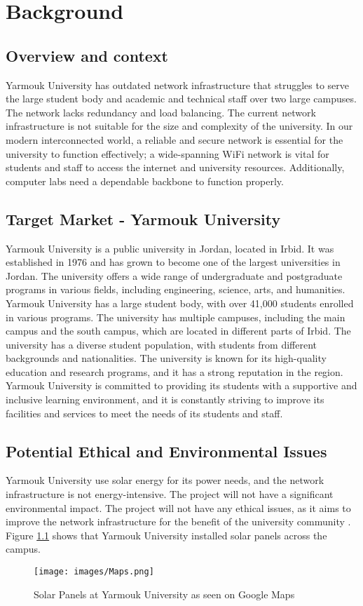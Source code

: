 \documentclass[12pt]{report}
\begin{document}

\chapter{Background}
\section{Overview and context}

Yarmouk University has outdated network infrastructure that struggles to serve the large student body and academic and technical staff over two large campuses. The network lacks redundancy and load balancing. The current network infrastructure is not suitable for the size and complexity of the university. In our modern interconnected world, a reliable and secure network is essential for the university to function effectively; a wide-spanning WiFi network is vital for students and staff to access the internet and university resources. Additionally, computer labs need a dependable backbone to function properly.
\section{Target Market - Yarmouk University}
Yarmouk University is a public university in Jordan, located in Irbid. It was established in 1976 and has grown to become one of the largest universities in Jordan. The university offers a wide range of undergraduate and postgraduate programs in various fields, including engineering, science, arts, and humanities. Yarmouk University has a large student body, with over 41,000 students enrolled in various programs. The university has multiple campuses, including the main campus and the south campus, which are located in different parts of Irbid. The university has a diverse student population, with students from different backgrounds and nationalities. The university is known for its high-quality education and research programs, and it has a strong reputation in the region. Yarmouk University is committed to providing its students with a supportive and inclusive learning environment, and it is constantly striving to improve its facilities and services to meet the needs of its students and staff. \cite{YU}

\section{Potential Ethical and Environmental Issues}
Yarmouk University use solar energy for its power needs, and the network infrastructure is not energy-intensive. The project will not have a significant environmental impact. The project will not have any ethical issues, as it aims to improve the network infrastructure for the benefit of the university community \cite{Solar}. Figure \ref{fig:YUMap} shows that Yarmouk University installed solar panels across the campus. 
\begin{figure}[h]
    \centering
    \texttt{[image: images/Maps.png]}
    \caption{Solar Panels at Yarmouk University as seen on Google Maps}
    \label{fig:YUMap}
\end{figure}
\newpage
\end{document}
